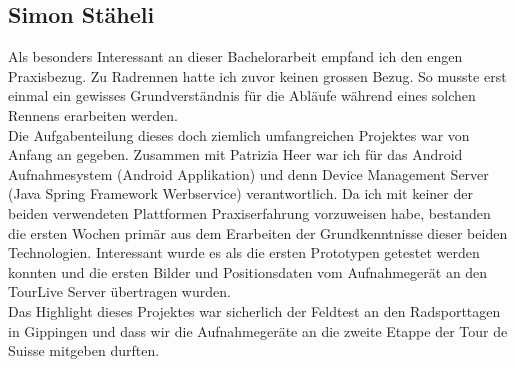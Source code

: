 \subsection{Simon Stäheli}
Als besonders Interessant an dieser Bachelorarbeit empfand ich den engen Praxisbezug. Zu Radrennen hatte ich zuvor keinen grossen Bezug. So musste erst einmal ein gewisses Grundverständnis für die Abläufe während eines solchen Rennens erarbeiten werden. 
\\

Die Aufgabenteilung dieses doch ziemlich umfangreichen Projektes war von Anfang an gegeben. Zusammen mit Patrizia Heer war ich für das Android Aufnahmesystem (Android Applikation) und denn Device Management Server (Java Spring Framework Werbservice) verantwortlich. Da ich mit keiner der beiden verwendeten Plattformen Praxiserfahrung vorzuweisen habe, bestanden die ersten Wochen primär aus dem Erarbeiten der  Grundkenntnisse dieser beiden Technologien. Interessant wurde es als die ersten Prototypen getestet werden konnten und die ersten Bilder und Positionsdaten vom Aufnahmegerät an den TourLive Server übertragen wurden.
\\

Das Highlight dieses Projektes war sicherlich der Feldtest an den Radsporttagen in Gippingen und dass wir die Aufnahmegeräte an die zweite Etappe der Tour de Suisse mitgeben durften. 


